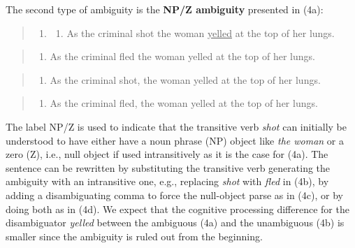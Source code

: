\documentclass[a4paper, nobind]{templates/ociamthesis}
\providecommand{\tightlist}{%
  \setlength{\itemsep}{0pt}\setlength{\parskip}{0pt}}
\begin{document}
The second type of ambiguity is the \textbf{NP/Z ambiguity} presented in (4a):

\begin{quote}
\begin{enumerate}
\def\labelenumi{(\arabic{enumi})}
\setcounter{enumi}{3}
\item
  \begin{enumerate}
  \def\labelenumii{\alph{enumii}.}
  \tightlist
  \item
    As the criminal shot the woman \underline{yelled} at the top of her lungs. \footnotesize{}
  \end{enumerate}
\end{enumerate}
\end{quote}

\begin{quote}
\begin{enumerate}
\def\labelenumi{\alph{enumi}.}
\setcounter{enumi}{1}
\tightlist
\item
  As the criminal fled the woman yelled at the top of her lungs. \footnotesize{}
\end{enumerate}
\end{quote}

\begin{quote}
\begin{enumerate}
\def\labelenumi{\alph{enumi}.}
\setcounter{enumi}{2}
\tightlist
\item
  As the criminal shot, the woman yelled at the top of her lungs. \footnotesize{}
\end{enumerate}
\end{quote}

\begin{quote}
\begin{enumerate}
\def\labelenumi{\alph{enumi}.}
\setcounter{enumi}{3}
\tightlist
\item
  As the criminal fled, the woman yelled at the top of her lungs. \footnotesize{}
\end{enumerate}
\end{quote}

The label NP/Z is used to indicate that the transitive verb \emph{shot} can initially be understood to have either have a noun phrase (NP) object like \emph{the woman} or a zero (Z), i.e., null object if used intransitively as it is the case for (4a). The sentence can be rewritten by substituting the transitive verb generating the ambiguity with an intransitive one, e.g., replacing \emph{shot} with \emph{fled} in (4b), by adding a disambiguating comma to force the null-object parse as in (4c), or by doing both as in (4d). We expect that the cognitive processing difference for the disambiguator \emph{yelled} between the ambiguous (4a) and the unambiguous (4b) is smaller since the ambiguity is ruled out from the beginning.
\end{document}
